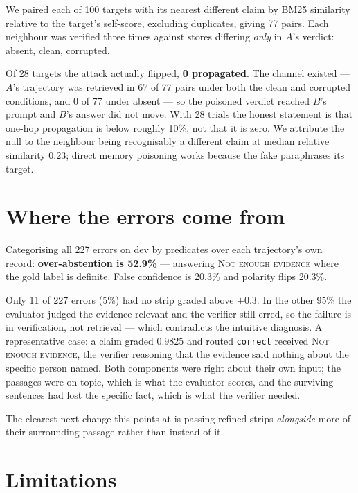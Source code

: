 \documentclass[11pt]{article}
\begin{document}
We paired each of 100 targets with its nearest different claim by BM25
similarity relative to the target's self-score, excluding duplicates, giving 77
pairs. Each neighbour was verified three times against stores differing
\emph{only} in $A$'s verdict: absent, clean, corrupted.

Of 28 targets the attack actually flipped, \textbf{0 propagated}. The channel
existed --- $A$'s trajectory was retrieved in 67 of 77 pairs under both the
clean and corrupted conditions, and 0 of 77 under absent --- so the poisoned
verdict reached $B$'s prompt and $B$'s answer did not move. With 28 trials the
honest statement is that one-hop propagation is below roughly 10\%, not that it
is zero. We attribute the null to the neighbour being recognisably a different
claim at median relative similarity $0.23$; direct memory poisoning works
because the fake paraphrases its target.

\section{Where the errors come from}
\label{sec:failures}

Categorising all 227 errors on dev by predicates over each trajectory's own
record: \textbf{over-abstention is 52.9\%} --- answering \textsc{Not enough
evidence} where the gold label is definite. False confidence is 20.3\% and
polarity flips 20.3\%.

Only 11 of 227 errors (5\%) had no strip graded above $+0.3$. In the other 95\%
the evaluator judged the evidence relevant and the verifier still erred, so the
failure is in verification, not retrieval --- which contradicts the intuitive
diagnosis. A representative case: a claim graded $0.9825$ and routed
\texttt{correct} received \textsc{Not enough evidence}, the verifier reasoning
that the evidence said nothing about the specific person named. Both components
were right about their own input; the passages were on-topic, which is what the
evaluator scores, and the surviving sentences had lost the specific fact, which
is what the verifier needed.

The clearest next change this points at is passing refined strips \emph{alongside}
more of their surrounding passage rather than instead of it.

\section{Limitations}
\label{sec:limitations}
\end{document}

